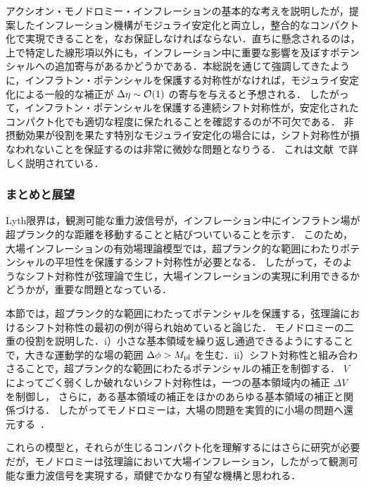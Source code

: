 アクシオン・モノドロミー・インフレーションの基本的な考えを説明したが，提案したインフレーション機構がモジュライ安定化と両立し，整合的なコンパクト化で実現できることを，なお保証しなければならない．直ちに懸念されるのは，上で特定した線形項以外にも，インフレーション中に重要な影響を及ぼすポテンシャルへの追加寄与があるかどうかである．本総説を通じて強調してきたように，インフラトン・ポテンシャルを保護する対称性がなければ，モジュライ安定化による一般的な補正が $\Delta\eta\sim {\cal O}(1)$ の寄与を与えると予想される．
したがって，インフラトン・ポテンシャルを保護する連続シフト対称性が，安定化されたコンパクト化でも適切な程度に保たれることを確認するのが不可欠である．
非摂動効果が役割を果たす特別なモジュライ安定化の場合には，シフト対称性が損なわれないことを保証するのは非常に微妙な問題となりうる．
これは文献~\cite{MSW}で詳しく説明されている．



\subsubsection{まとめと展望}
\label{sec:axionS}

Lyth限界は，観測可能な重力波信号が，インフレーション中にインフラトン場が超プランク的な距離を移動することと結びついていることを示す．
このため，大場インフレーションの有効場理論模型では，超プランク的な範囲にわたりポテンシャルの平坦性を保護するシフト対称性が必要となる．
したがって，そのようなシフト対称性が弦理論で生じ，大場インフレーションの実現に利用できるかどうかが，重要な問題となっている．

本節では，超プランク的な範囲にわたってポテンシャルを保護する，弦理論におけるシフト対称性の最初の例が得られ始めていると論じた．
モノドロミーの二重の役割を説明した．i）小さな基本領域を繰り返し通過できるようにすることで，大きな運動学的な場の範囲 $\Delta \phi > M_{\rm pl}$ を生む．ii）シフト対称性と組み合わさることで，超プランク的な範囲にわたるポテンシャルの補正を制御する．
$V$ によってごく弱くしか破れないシフト対称性は，一つの基本領域内の補正 $\Delta V$ を制御し，
さらに，ある基本領域の補正をほかのあらゆる基本領域の補正と関係づける．
したがってモノドロミーは，大場の問題を実質的に小場の問題へ還元する~\cite{Silverstein:2008sg}．

これらの模型と，それらが生じるコンパクト化を理解するにはさらに研究が必要だが，モノドロミーは弦理論において大場インフレーション，したがって観測可能な重力波信号を実現する，頑健でかなり有望な機構と思われる．




